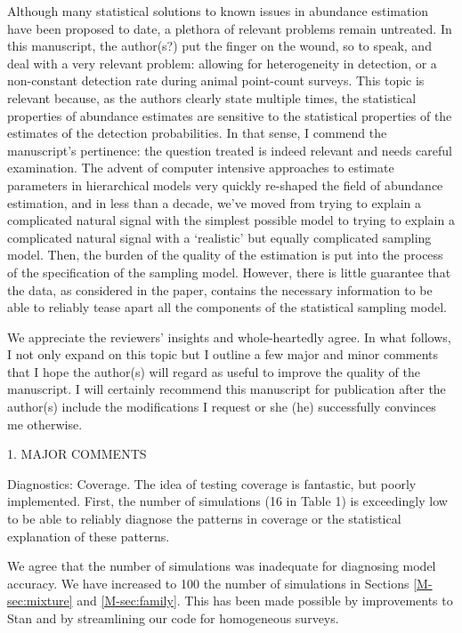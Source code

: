 \documentclass[12pt]{article}
\renewenvironment{quote}  %
              {\list{}{\rightmargin\leftmargin}\normalfont%
               \item\relax}
              {\endlist}
\begin{document}
Although many statistical solutions to known issues in abundance estimation have been proposed to date, a plethora of relevant problems remain untreated.  In this manuscript, the author(s?) put the finger on the wound, so to speak, and deal with a very relevant problem: allowing for heterogeneity in detection, or a non-constant detection rate during animal point-count surveys.  This topic is relevant because, as the authors clearly state multiple times, the statistical properties of abundance estimates are sensitive to the statistical properties of the estimates of the detection probabilities. In that sense, I commend the manuscript's pertinence: the question treated is indeed relevant and needs careful examination.
The advent of computer intensive approaches to estimate parameters in hierarchical models very quickly re-shaped the field of abundance estimation, and in less than a decade, we've moved from trying to explain a complicated natural signal with the simplest possible model to trying to explain a complicated natural signal with a `realistic' but equally complicated sampling model. Then, the burden of the quality of the estimation is put into the process of the specification of the sampling model. However, there is little guarantee that the data, as considered in the paper, contains the necessary information to be able to reliably tease apart all the components of the statistical sampling model. 
\begin{quote}
We appreciate the reviewers' insights and whole-heartedly agree.
\end{quote}
In what follows, I not only expand on this topic but I outline a few major and minor comments that I hope the author(s) will regard as useful to improve the quality of the manuscript. I will certainly recommend this manuscript for publication after the author(s) include the
modifications I request or she (he) successfully convinces me otherwise.



1. MAJOR COMMENTS


Diagnostics: Coverage. The idea of testing coverage is fantastic, but poorly implemented. First, the number of simulations (16 in Table 1) is exceedingly low to be able to reliably diagnose the patterns in coverage or the statistical explanation of these patterns. 
\begin{quote}
We agree that the number of simulations was inadequate for diagnosing model accuracy.
We have increased to 100 the number of simulations in Sections \ref{M-sec:mixture} and \ref{M-sec:family}.
This has been made possible by improvements to Stan \citep{Rstan2016} and by streamlining our code for homogeneous surveys.
\end{quote}
\end{document}
